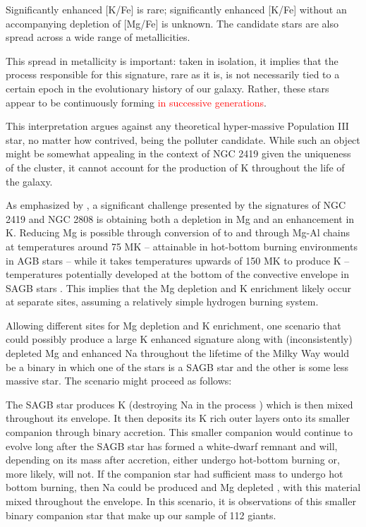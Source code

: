 \documentclass[a4paper,fleqn,usenatbib]{mnras}
\newcommand{\todo}[1]{\textcolor{red}{#1}}
\begin{document}
Significantly enhanced [K/Fe] is rare; significantly enhanced [K/Fe] without an accompanying depletion of [Mg/Fe] is unknown. The candidate stars are also spread across a wide range of metallicities.

This spread in metallicity is important: taken in isolation, it implies that the process responsible for this signature, rare as it is, is not necessarily tied to a certain epoch in the evolutionary history of our galaxy. Rather, these stars appear to be continuously forming \todo{ in successive generations}.

This interpretation argues against any theoretical hyper-massive Population III star, no matter how contrived, being the polluter candidate. While such an object might be somewhat appealing in the context of NGC 2419 given the uniqueness of the cluster, it cannot account for the production of K throughout the life of the galaxy.

As emphasized by \cite{prantzos2017}, a significant challenge presented by the signatures of NGC 2419 and NGC 2808 is obtaining both a depletion in Mg and an enhancement in K. Reducing Mg is possible through conversion of  to  and through Mg-Al chains at temperatures around 75 MK --  attainable in hot-bottom burning environments in AGB stars -- while it takes temperatures upwards of 150 MK to produce K -- temperatures potentially developed at the bottom of the convective envelope in SAGB stars \citep{iliadis2016}. This implies that the Mg depletion and K enrichment likely occur at separate sites, assuming a relatively simple hydrogen burning system.

Allowing different sites for Mg depletion and K enrichment, one scenario that could possibly produce a large K enhanced signature along with (inconsistently) depleted Mg and enhanced Na throughout the lifetime of the Milky Way would be a binary in which one of the stars is a SAGB star and the other is some less massive star. The scenario might proceed as follows:

The SAGB star produces K (destroying Na in the process \citep{prantzos2017}) which is then mixed throughout its envelope. It then deposits its K rich outer layers onto its smaller companion through binary accretion. This smaller companion would continue to evolve long after the SAGB star has formed a white-dwarf remnant and will, depending on its mass after accretion, either undergo hot-bottom burning or, more likely, will not. If the companion star had sufficient mass to undergo hot bottom burning, then Na could be produced and Mg depleted \citep{prantzos2017}, with this material mixed throughout the envelope. In this scenario, it is observations of this smaller binary companion star that make up our sample of 112 giants.
\end{document}

